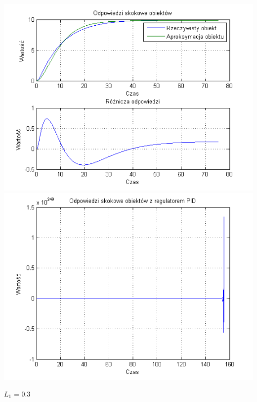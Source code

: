 \documentclass[10pt,a4paper]{article}
\begin{document}
\begin{center}
\includegraphics[scale=1]{images/dwa/skrypt_213.png}\\
\includegraphics[scale=1]{images/dwa/skrypt_214.png}\\
\end{center}
\newpage
$L_1$ = 0.3
\end{document}
